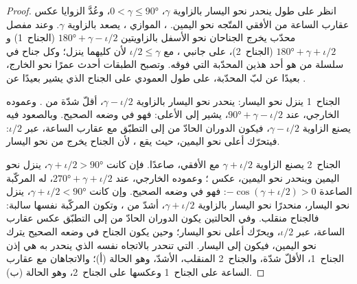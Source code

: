 \begin{proof}
انظر على طول   ينحدر نحو اليسار بالزاوية
$\gamma$، $0 < \gamma \le \ang{90}$، وعُدَّ الزوايا عكس عقارب الساعة من الأفقي المتّجه نحو اليمين. ، الموازي ، يصعد بالزاوية $\gamma$. وعند مفصل محدّب يخرج الجناحان نحو الأسفل بالزاويتين $\ang{180} + \gamma - \iota/2$ (الجناح~1) و$\ang{180} + \gamma + \iota/2$ (الجناح~2)، على جانبي ، مع $\iota/2 \le \gamma$ لأن كليهما ينزل؛ وكل جناح في سلسلة من  هو أحد هذين  المحدّبة التي فوقه. وتصبح الطبقات أحدث عمرًا نحو الخارج، بعيدًا عن لبّ  المحدّبة، على طول العمودي على الجناح الذي يشير بعيدًا عن .

الجناح~1 ينزل نحو اليسار: ينحدر نحو اليسار بالزاوية $\gamma - \iota/2$، أقلّ شدّة من . وعموده الخارجي، عند $\ang{90} + \gamma -
\iota/2$، يشير إلى الأعلى: فهو في وضعه الصحيح. وبالصعود فيه يصنع الزاوية $\gamma - \iota/2$، فيكون الدوران الحادّ من  إلى التطبّق مع عقارب الساعة، عبر $\iota/2$: فيتحرّك أعلى  نحو اليمين، حيث يقع ، لأن الجناح يخرج من  نحو اليسار.

الجناح~2 يصنع الزاوية $\gamma + \iota/2$ مع الأفقي، صاعدًا. فإن كانت $\gamma + \iota/2 > \ang{90}$، ينزل نحو اليمين وينحدر نحو اليمين، عكس ؛ وعموده الخارجي، عند $\ang{270} + \gamma +
\iota/2$، له المركّبة الصاعدة $-\cos(\gamma + \iota/2) > 0$: فهو في وضعه الصحيح. وإن كانت $\gamma + \iota/2 < \ang{90}$، ينزل نحو اليسار، منحدرًا نحو اليسار بالزاوية $\gamma + \iota/2$، أشدّ من ، وتكون المركّبة نفسها سالبة: فالجناح منقلب. وفي الحالتين يكون الدوران الحادّ من  إلى التطبّق عكس عقارب الساعة، عبر $\iota/2$، ويحرّك أعلى  نحو اليسار؛ وحين يكون الجناح في وضعه الصحيح يترك  نحو اليمين، فيكون  إلى اليسار.  التي تنحدر بالاتجاه نفسه الذي ينحدر به  هي إذن الجناح~1، الأقلّ شدّة، والجناح~2 المنقلب، الأشدّ، وهو الحالة (أ)؛ والاتجاهان مع عقارب الساعة على الجناح~1 وعكسها على الجناح~2، وهو الحالة (ب).
\end{proof}

